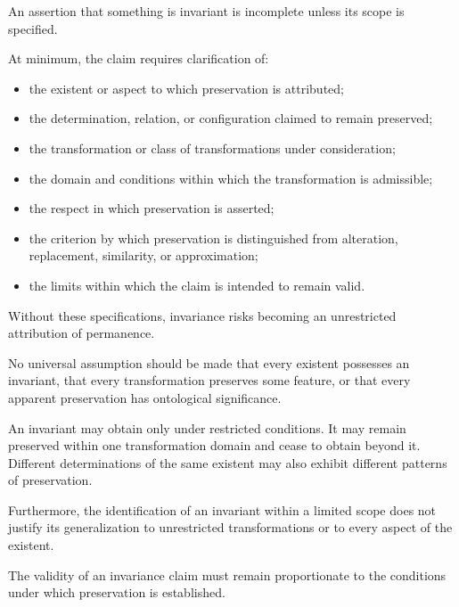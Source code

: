 An assertion that something is invariant is incomplete
unless its scope is specified.

At minimum, the claim requires clarification of:

\begin{itemize}

    \item the existent or aspect to which preservation
    is attributed;

    \item the determination, relation, or configuration
    claimed to remain preserved;

    \item the transformation or class of transformations
    under consideration;

    \item the domain and conditions within which the
    transformation is admissible;

    \item the respect in which preservation is asserted;

    \item the criterion by which preservation is
    distinguished from alteration, replacement,
    similarity, or approximation;

    \item the limits within which the claim is intended
    to remain valid.

\end{itemize}

Without these specifications, invariance risks becoming
an unrestricted attribution of permanence.

No universal assumption should be made that every
existent possesses an invariant, that every
transformation preserves some feature, or that
every apparent preservation has ontological significance.

An invariant may obtain only under restricted conditions.
It may remain preserved within one transformation
domain and cease to obtain beyond it. Different
determinations of the same existent may also exhibit
different patterns of preservation.

Furthermore, the identification of an invariant
within a limited scope does not justify its
generalization to unrestricted transformations
or to every aspect of the existent.

The validity of an invariance claim must remain
proportionate to the conditions under which
preservation is established.

